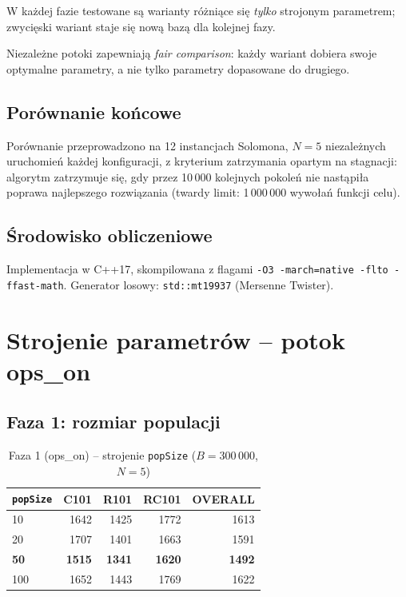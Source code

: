 \documentclass[11pt,a4paper]{article}
\begin{document}
W każdej fazie testowane są warianty różniące się \emph{tylko} strojonym parametrem;
zwycięski wariant staje się nową bazą dla kolejnej fazy.

Niezależne potoki zapewniają \textit{fair comparison}: każdy wariant dobiera
swoje optymalne parametry, a nie tylko parametry dopasowane do drugiego.

\subsection{Porównanie końcowe}

Porównanie przeprowadzono na 12 instancjach Solomona, $N=5$ niezależnych
uruchomień każdej konfiguracji, z kryterium zatrzymania opartym na stagnacji:
algorytm zatrzymuje się, gdy przez 10\,000 kolejnych pokoleń nie nastąpiła
poprawa najlepszego rozwiązania (twardy limit: 1\,000\,000 wywołań funkcji celu).

\subsection{Środowisko obliczeniowe}

Implementacja w C++17, skompilowana z flagami \texttt{-O3 -march=native -flto
-ffast-math}. Generator losowy: \texttt{std::mt19937} (Mersenne Twister).

\section{Strojenie parametrów -- potok ops\_on}
\label{sec:tuning_on}

\subsection{Faza 1: rozmiar populacji}

\begin{table}[H]
\centering
\caption{Faza 1 (ops\_on) -- strojenie \texttt{popSize} ($B=300\,000$, $N=5$)}
\begin{tabular}{lrrrr}
\toprule
\texttt{popSize} & C101 & R101 & RC101 & OVERALL \\
\midrule
10  & 1642 & 1425 & 1772 & 1613 \\
20  & 1707 & 1401 & 1663 & 1591 \\
\textbf{50}  & \textbf{1515} & \textbf{1341} & \textbf{1620} & \textbf{1492} \\
100 & 1652 & 1443 & 1769 & 1622 \\
\bottomrule
\end{tabular}
\end{table}
\end{document}
